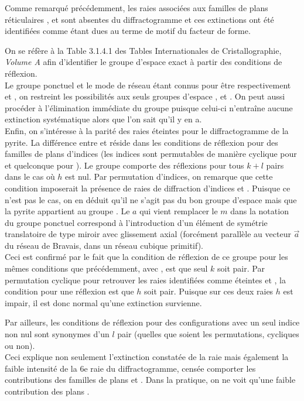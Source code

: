 Comme remarqué précédemment, les raies associées aux familles de plans réticulaires ,  et  sont absentes du diffractogramme et ces extinctions ont été identifiées comme étant dues au terme de motif du facteur de forme.

On se réfère à la Table 3.1.4.1 des Tables Internationales de Cristallographie, \textit{Volume A} \cite{LooijengaVosIUCr2006} afin d'identifier le groupe d'espace exact à partir des conditions de réflexion.\\
Le groupe ponctuel et le mode de réseau étant connus pour être respectivement  et , on restreint les possibilités aux seuls groupes d'espace ,  et .
On peut aussi procéder à l'élimination immédiate du groupe  puisque celui-ci n'entraîne aucune extinction systématique alors que l'on sait qu'il y en a.\\
Enfin, on s'intéresse à la parité des raies éteintes pour le diffractogramme de la pyrite.
La différence entre  et  réside dans les conditions de réflexion pour des familles de plans d'indices  (les indices sont permutables de manière cyclique pour  et quelconque pour ).
Le groupe  comporte des réflexions pour tous \(k + l\) pairs dans le cas où \(h\) est nul.
Par permutation d'indices, on remarque que cette condition imposerait la présence de raies de diffraction d'indices  et .
Puisque ce n'est pas le cas, on en déduit qu'il ne s'agit pas du bon groupe d'espace mais que la pyrite appartient au groupe .
Le \(a\) qui vient remplacer le \(m\) dans la notation du groupe ponctuel correspond à l'introduction d'un élément de symétrie translatoire de type miroir avec glissement axial (forcément parallèle au vecteur \(\vec{a}\) du réseau de Bravais, dans un réseau cubique primitif).\\
Ceci est confirmé par le fait que la condition de réflexion de ce groupe pour les mêmes conditions que précédemment, avec , est que seul \(k\) soit pair.
Par permutation cyclique pour retrouver les raies identifiées comme éteintes  et , la condition pour une réflexion est que \(h\) soit pair.
Puisque sur ces deux raies \(h\) est impair, il est donc normal qu'une extinction survienne.

Par ailleurs, les conditions de réflexion pour des configurations avec un seul indice non nul  sont synonymes d'un \(l\) pair (quelles que soient les permutations, cycliques ou non).\\
Ceci explique non seulement l'extinction constatée de la raie  mais également la faible intensité de la 6e raie du diffractogramme, censée comporter les contributions des familles de plans  et .
Dans la pratique, on ne voit qu'une faible contribution des plans .

